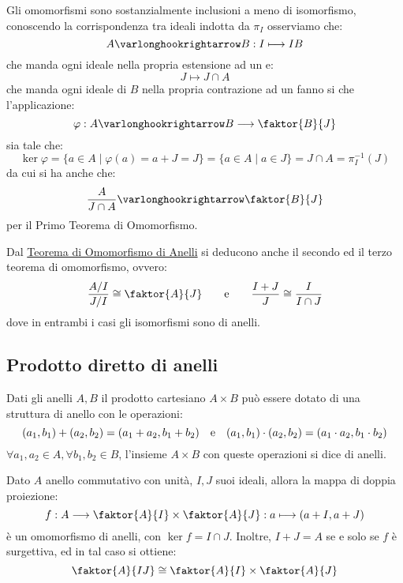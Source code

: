 \documentclass[11pt]{scrartcl}
\begin{document}
\begin{remark}
    Gli omomorfismi sono sostanzialmente inclusioni a meno di isomorfismo, conoscendo la corrispondenza tra ideali indotta da $\pi_I$ osserviamo che:
        \[ A \varlonghookrightarrow B : I \longmapsto IB
            \]
    che manda ogni ideale nella propria estensione ad un  e:
        \[ J \longmapsto J\cap A
            \]
    che manda ogni ideale di $B$ nella propria contrazione ad un  fanno si che l'applicazione:
        \[ \varphi : A \varlonghookrightarrow B \longrightarrow \faktor{B}{J}
            \]
    sia tale che:
        \[ \ker \varphi = \{a \in A \mid \varphi(a) = a + J = J\} = \{a \in A \mid a \in J\} = J \cap A = \pi_{I}^{-1}(J)
            \]
    da cui si ha anche che:
        \[ \frac{A}{J \cap A} \varlonghookrightarrow \faktor{B}{J}
            \]
    per il Primo Teorema di Omomorfismo.
\end{remark}

\begin{remark}
Dal \hyperref[omo]{Teorema di Omomorfismo di Anelli} si deducono anche il secondo ed il terzo teorema di omomorfismo, ovvero:
    \[ \frac{A/I}{J/I} \cong \faktor{A}{J} \qquad \text e \qquad \frac{I+J}{J} \cong \frac{I}{I \cap J}
        \]
dove in entrambi i casi gli isomorfismi sono di anelli.    
\end{remark}

\newpage
\subsection{Prodotto diretto di anelli}
\begin{definition}
    Dati gli anelli $A,B$ il prodotto cartesiano $A \times B$ può essere dotato di una struttura di anello con le operazioni:
        \[ (a_1,b_1) + (a_2,b_2) = (a_1+a_2,b_1+b_2) \quad \text e \quad (a_1,b_1) \cdot (a_2,b_2) = (a_1 \cdot a_2,b_1 \cdot b_2) 
            \]
    $\forall a_1,a_2 \in A, \forall b_1,b_2 \in B$, l'insieme $A \times B$ con queste operazioni si dice  di anelli.
\end{definition}

\begin{theorem}
    \label{t:cinese}
    Dato $A$ anello commutativo con unità, $I,J$ suoi ideali, allora la mappa di doppia proiezione:
    \[ f: A \longrightarrow \faktor{A}{I} \times \faktor{A}{J} : a \longmapsto (a+I,a+J)
        \]
    è un omomorfismo di anelli, con $\ker f = I \cap J$. Inoltre, $I+J = A$ se e solo se $f$ è surgettiva, ed in tal caso si ottiene:
    \[ \faktor{A}{IJ} \cong \faktor{A}{I} \times \faktor{A}{J}
        \]
\end{theorem}
\end{document}
